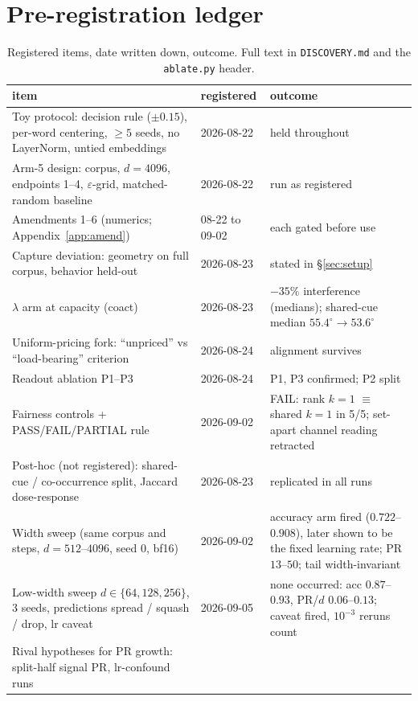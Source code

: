 \documentclass{article}
\newcommand{\degr}{^{\circ}}
\begin{document}
\section{Pre-registration ledger}\label{app:prereg}
\begin{table}[h]
  \centering\scriptsize
  \caption{Registered items, date written down, outcome. Full text in
  \texttt{DISCOVERY.md} and the \texttt{ablate.py} header.}
  \begin{tabular}{p{6.6cm}p{1.6cm}p{4.2cm}}
    \toprule
    item & registered & outcome \\
    \midrule
    Toy protocol: decision rule ($\pm0.15$), per-word centering, $\ge5$ seeds, no LayerNorm,
    untied embeddings & 2026-08-22 & held throughout \\
    Arm-5 design: corpus, $d{=}4096$, endpoints 1--4, $\varepsilon$-grid, matched-random
    baseline & 2026-08-22 & run as registered \\
    Amendments 1--6 (numerics; Appendix~\ref{app:amend}) & 08-22 to 09-02 & each gated
    before use \\
    Capture deviation: geometry on full corpus, behavior held-out & 2026-08-23 & stated
    in \S\ref{sec:setup} \\
    $\lambda$ arm at capacity (coact) & 2026-08-23 & $-35\%$ interference
    (medians); shared-cue median $55.4\degr\to53.6\degr$ \\
    Uniform-pricing fork: ``unpriced'' vs ``load-bearing'' criterion & 2026-08-24 &
    alignment survives \\
    Readout ablation P1--P3 & 2026-08-24 & P1, P3 confirmed; P2 split \\
    Fairness controls + PASS/FAIL/PARTIAL rule & 2026-09-02 & FAIL: rank
    $k{=}1$ $\equiv$ shared $k{=}1$ in 5/5; set-apart channel reading retracted \\
    Post-hoc (not registered): shared-cue / co-occurrence split, Jaccard dose-response &
    2026-08-23 & replicated in all runs \\
    Width sweep (same corpus and steps, $d{=}512$--$4096$, seed 0, bf16) &
    2026-09-02 & accuracy arm fired ($0.722$--$0.908$), later shown to be the
    fixed learning rate; PR $13$--$50$; tail width-invariant \\
    Low-width sweep $d\in\{64,128,256\}$, 3 seeds, predictions spread / squash /
    drop, lr caveat & 2026-09-05 & none occurred: acc $0.87$--$0.93$, PR/$d$
    $0.06$--$0.13$; caveat fired, $10^{-3}$ reruns count \\
    Rival hypotheses for PR growth: split-half signal PR, lr-confound runs &

\end{tabular}
\end{table}
\end{document}
